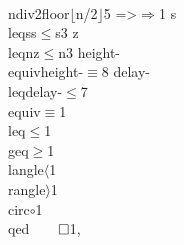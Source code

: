 {                        {\\ndiv2floor}{{\(\lfloor\)n/2\(\rfloor\)}}5
                        {=>}{{\(\Rightarrow\)}}1
                        {s\\leqs}{{s\(\leq\)s}}3
                        {z\\leqn}{{z\(\leq\)n}}3
                        {height-\\equiv}{{{\symbolstyle height-\(\equiv\)}}}8
                        {delay-\\leq}{{{\symbolstyle delay-\(\leq\)}}}7
                        {\\equiv}{{\(\equiv\)}}1
                        {\\leq}{{\(\leq\)}}1
                        {\\geq}{{\(\geq\)}}1
                        {\\langle}{{\(\langle\)}}1
                        {\\rangle}{{\(\rangle\)}}1
                        {\\circ}{{\(\circ\)}}1
                        {\\qed}{{\(\qed\)}}1,
}
\lstset{language=agda}